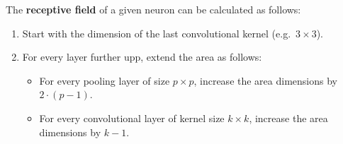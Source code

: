 The \textbf{receptive field} of a given neuron can be calculated as follows:
\begin{enumerate}
    \item Start with the dimension of the last convolutional kernel (e.g.\ \(3 \times 3\)).
    \item For every layer further upp, extend the area as follows:
    \begin{itemize}
        \item For every pooling layer of size \(p \times p\), increase the area dimensions by \(2 \cdot (p-1)\).
        \item For every convolutional layer of kernel size \(k \times k\), increase the area dimensions by \(k-1\).
    \end{itemize}
\end{enumerate}
